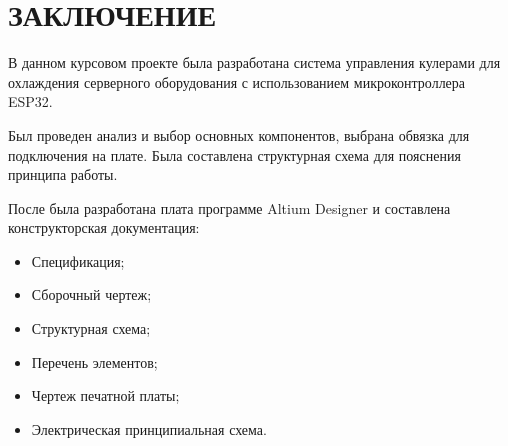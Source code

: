 \chapter*{ЗАКЛЮЧЕНИЕ}

В данном курсовом проекте была разработана система управления кулерами для охлаждения серверного оборудования с использованием микроконтроллера ESP32.

Был проведен анализ и выбор основных компонентов, выбрана обвязка для подключения на плате. Была составлена структурная схема для пояснения принципа работы.

После была разработана плата программе Altium Designer и составлена конструкторская документация:

\begin{itemize}

	\item Спецификация;
	
	\item Сборочный чертеж;
	
	\item Структурная схема;
	
	\item Перечень элементов;
	
	\item Чертеж печатной платы;
	
	\item Электрическая принципиальная схема.

\end{itemize}